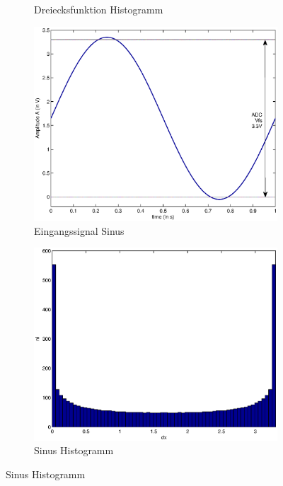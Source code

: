 \documentclass[SSS_Laborbericht.tex]{subfiles}
\begin{document}
\begin{figure}[!ht]
\begin{subfigure}{.499\textwidth}
		\caption{Dreiecksfunktion Histogramm}
		\label{fig:GRUNDL_RAMP_HIST_3X3}
	\end{subfigure}
	\begin{subfigure}{.499\textwidth}
		\centering\small
		\includegraphics[width=\textwidth]{media/matlab/HISTOGRAM/sin_fkt_samples_5000.eps}
		\caption{Eingangssignal Sinus}
		\label{fig:GRUNDL_SIN_SIN_3X3}
	\end{subfigure}%
	\begin{subfigure}{.499\textwidth}
		\centering\small
		\includegraphics[width=\textwidth]{media/matlab/HISTOGRAM/sin_hist_samples_5000.eps}
		\caption{Sinus Histogramm}

\end{subfigure}
\end{figure}
\end{document}
